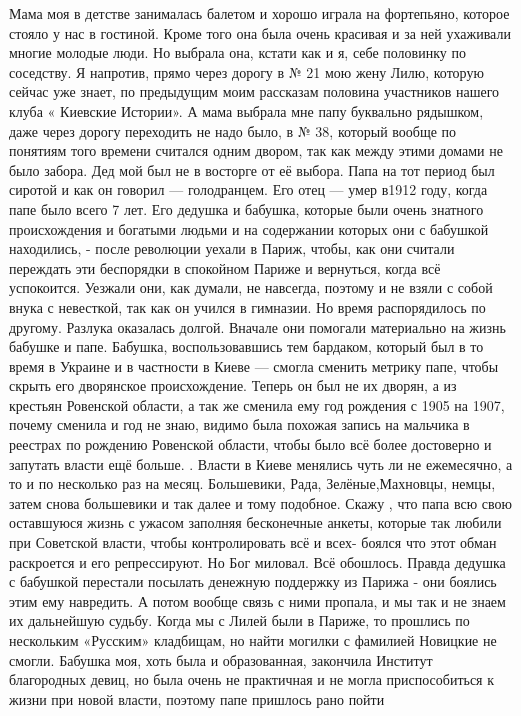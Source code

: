 Мама моя в детстве занималась балетом и
хорошо играла на фортепьяно, которое стояло у нас в гостиной. Кроме того она
была очень красивая и за ней ухаживали многие молодые люди. Но выбрала она,
кстати  как и я,  себе половинку по соседству. Я напротив, прямо через
дорогу в № 21 мою жену Лилю, которую сейчас  уже знает, по предыдущим моим
рассказам   половина участников нашего клуба « Киевские Истории».  А мама
выбрала мне папу буквально  рядышком, даже через дорогу переходить не надо
было, в № 38, который вообще по понятиям того времени считался одним двором,
так как между этими домами не было забора. Дед мой был не в восторге от её
выбора. Папа на тот период был сиротой и как он говорил — голодранцем. Его
отец — умер в1912 году, когда папе было всего 7 лет. Его дедушка и бабушка,
которые были очень знатного происхождения и богатыми людьми и на содержании
которых они с бабушкой находились, - после революции уехали в Париж, чтобы,
как они считали  переждать эти беспорядки в спокойном Париже и вернуться,
когда всё успокоится. Уезжали они, как думали, не навсегда, поэтому и не
взяли с собой внука с невесткой, так как он учился в гимназии. Но время
распорядилось по другому. Разлука оказалась долгой. Вначале они помогали
материально на жизнь бабушке и папе. Бабушка, воспользовавшись тем бардаком,
который был в то время в  Украине и в частности в Киеве — смогла сменить
метрику папе, чтобы скрыть его дворянское происхождение. Теперь он был не их
дворян, а из крестьян Ровенской области, а так же сменила ему год рождения с
1905 на 1907, почему сменила  и год не знаю, видимо была похожая запись на
мальчика в реестрах по рождению Ровенской области, чтобы было всё более
достоверно и запутать власти ещё больше. . Власти в Киеве менялись чуть ли не
ежемесячно, а то и по несколько раз на месяц. Большевики, Рада,
Зелёные,Махновцы, немцы, затем снова большевики и так далее и тому подобное.
Скажу , что папа всю свою оставшуюся жизнь с ужасом заполняя бесконечные
анкеты, которые так любили при Советской власти, чтобы контролировать всё и
всех-  боялся что этот обман раскроется и его репрессируют.  Но Бог миловал.
Всё обошлось. Правда дедушка с бабушкой перестали посылать денежную поддержку
из Парижа - они боялись этим ему навредить. А потом вообще связь с ними
пропала, и мы так и не знаем их дальнейшую судьбу. Когда мы с Лилей были в
Париже, то прошлись по нескольким «Русским» кладбищам, но найти могилки с
фамилией Новицкие не смогли.  Бабушка моя, хоть была и образованная, закончила
Институт благородных девиц, но была очень не практичная  и не могла
приспособиться к жизни при новой власти, поэтому папе пришлось рано пойти
